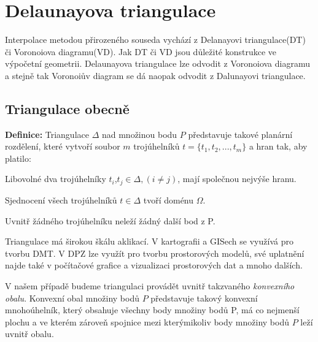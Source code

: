 \documentclass[12pt,a4paper]{article}
\begin{document}
\newpage
\section{Delaunayova triangulace}
Interpolace metodou přirozeného souseda vychází z Delanayovi triangulace(DT) či Voronoiova diagramu(VD). Jak DT či VD jsou důležité konstrukce ve výpočetní geometrii. Delaunayova triangulace lze odvodit z Voronoiova diagramu a stejně tak Voronoiův diagram se dá naopak odvodit z Dalunayovi triangulace.

\subsection{Triangulace obecně}
\textbf{Definice\cite{TB1}:}
Triangulace $\Delta$ nad množinou bodu $P$ představuje takové planární rozdělení, které vytvoří soubor $m$ trojúhelníků $t = \{ t_1, t_2,...,t_m \}$ a hran tak, aby platilo:

Libovolné dva trojúhelníky $t_i$,$t_j \in \Delta, (i \neq j)$, mají společnou nejvýše hranu.

Sjednocení všech trojúhelníků $t \in \Delta$ tvoří doménu $\Omega$.

Uvnitř žádného trojúhelníku neleží žádný další bod z P.

\bigskip
Triangulace má širokou škálu aklikací. V kartografii a GISech se využívá pro tvorbu DMT. V DPZ lze využít pro tvorbu prostorových modelů, své uplatnění najde také v počítačové grafice a vizualizaci prostorových dat a mnoho dalších.

V našem případě budeme triangulaci provádět uvnitř takzvaného \emph{konvexního obalu}. Konvexní obal množiny bodů $P$ představuje takový konvexní mnohoúhelník, který obsahuje všechny body množiny bodů P, má co nejmenší plochu a ve kterém zároveň spojnice mezi kterýmikoliv body množiny bodů $P$ leží uvnitř obalu.
\end{document}
